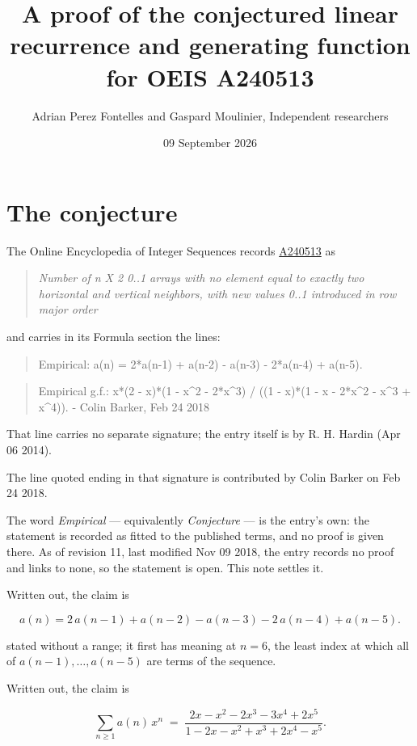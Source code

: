 \documentclass[11pt]{article}
\title{A proof of the conjectured linear recurrence and generating function for OEIS A240513}
\author{Adrian Perez Fontelles and Gaspard Moulinier, Independent researchers}
\date{09 September 2026}
\theoremstyle{definition}
\begin{document}
\maketitle
\section{The conjecture}

The Online Encyclopedia of Integer Sequences records \href{https://oeis.org/A240513}{A240513} as

\begin{quote}\itshape Number of n X 2 0..1 arrays with no element equal to exactly two horizontal and vertical neighbors, with new values 0..1 introduced in row major order\end{quote}

and carries in its Formula section the lines:

\begin{quote}\ttfamily Empirical: a(n) = 2*a(n-1) + a(n-2) - a(n-3) - 2*a(n-4) + a(n-5).\end{quote}

\begin{quote}\ttfamily Empirical g.f.: x*(2 - x)*(1 - x\textasciicircum{}2 - 2*x\textasciicircum{}3) / ((1 - x)*(1 - x - 2*x\textasciicircum{}2 - x\textasciicircum{}3 + x\textasciicircum{}4)). - Colin Barker, Feb 24 2018\end{quote}

That line carries no separate signature; the entry itself is by R. H. Hardin (Apr 06 2014).

The line quoted ending in that signature is contributed by Colin Barker on Feb 24 2018.

The word {\itshape Empirical} --- equivalently {\itshape Conjecture} --- is the entry's own: the statement is recorded as fitted to the published terms, and no proof is given there. As of revision 11, last modified Nov 09 2018, the entry records no proof and links to none, so the statement is open. This note settles it.

Written out, the claim is

\[a(n) = 2\,a(n-1) + a(n-2) - a(n-3) - 2\,a(n-4) + a(n-5).\]

stated without a range; it first has meaning at $n = 6$, the least index at which all of $a(n-1),\dots,a(n-5)$ are terms of the sequence.

Written out, the claim is

\[\sum_{n \ge 1} a(n)\,x^n \;=\; \frac{2x - x^{2} - 2x^{3} - 3x^{4} + 2x^{5}}{1 - 2x - x^{2} + x^{3} + 2x^{4} - x^{5}}.\]
\end{document}
